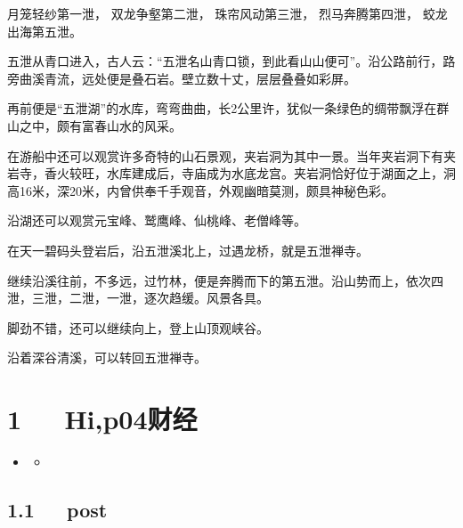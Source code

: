 \documentclass[letterpaper,12pt,english]{sphinxmanual}
\begin{document}
月笼轻纱第一泄，
双龙争壑第二泄，
珠帘风动第三泄，
烈马奔腾第四泄，
蛟龙出海第五泄。

五泄从青口进入，古人云：“五泄名山青口锁，到此看山山便可”。沿公路前行，路旁曲溪青流，远处便是叠石岩。壁立数十丈，层层叠叠如彩屏。

再前便是“五泄湖”的水库，弯弯曲曲，长2公里许，犹似一条绿色的绸带飘浮在群山之中，颇有富春山水的风采。

在游船中还可以观赏许多奇特的山石景观，夹岩洞为其中一景。当年夹岩洞下有夹岩寺，香火较旺，水库建成后，寺庙成为水底龙宫。夹岩洞恰好位于湖面之上，洞高16米，深20米，内曾供奉千手观音，外观幽暗莫测，颇具神秘色彩。

沿湖还可以观赏元宝峰、鹫鹰峰、仙桃峰、老僧峰等。

在天一碧码头登岩后，沿五泄溪北上，过遇龙桥，就是五泄禅寺。

继续沿溪往前，不多远，过竹林，便是奔腾而下的第五泄。沿山势而上，依次四泄，三泄，二泄，一泄，逐次趋缓。风景各具。

脚劲不错，还可以继续向上，登上山顶观峡谷。

沿着深谷清溪，可以转回五泄禅寺。


\chapter{1   Hi,p04财经}
\label{\detokenize{p04_u8d22_u7ecf/Hello_uff0cp04_u8d22_u7ecf:hi-p04}}\label{\detokenize{p04_u8d22_u7ecf/Hello_uff0cp04_u8d22_u7ecf::doc}}
\begin{sphinxShadowBox}
\begin{itemize}
\item {} 
\label{\detokenize{p04_u8d22_u7ecf/Hello_uff0cp04_u8d22_u7ecf:id2}}{\hyperref[\detokenize{p04_u8d22_u7ecf/Hello_uff0cp04_u8d22_u7ecf:hi-p04}]{}}
\begin{itemize}
\item {} 
\label{\detokenize{p04_u8d22_u7ecf/Hello_uff0cp04_u8d22_u7ecf:id3}}{\hyperref[\detokenize{p04_u8d22_u7ecf/Hello_uff0cp04_u8d22_u7ecf:post}]{}}

\end{itemize}

\end{itemize}
\end{sphinxShadowBox}


\section{1.1   post}
\label{\detokenize{p04_u8d22_u7ecf/Hello_uff0cp04_u8d22_u7ecf:post}}
\end{document}

